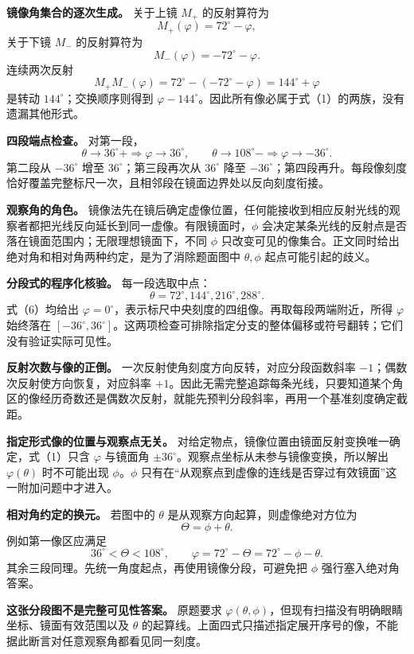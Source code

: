\documentclass[12pt,a4paper,UTF8]{ctexart}
\begin{document}
\textbf{镜像角集合的逐次生成。} 关于上镜 \(M_+\) 的反射算符为 \[
M_+(\varphi)=72^\circ-\varphi,
\] 关于下镜 \(M_-\) 的反射算符为 \[
M_-(\varphi)=-72^\circ-\varphi.
\] 连续两次反射 \[
M_+M_-(\varphi)
=72^\circ-(-72^\circ-\varphi)
=144^\circ+\varphi
\] 是转动 \(144^\circ\)；交换顺序则得到
\(\varphi-144^\circ\)。因此所有像必属于式（1）的两族，没有遗漏其他形式。

\textbf{四段端点检查。} 对第一段， \[
\theta\to36^\circ+\Rightarrow\varphi\to36^\circ,
\qquad
\theta\to108^\circ-\Rightarrow\varphi\to-36^\circ.
\] 第二段从 \(-36^\circ\) 增至 \(36^\circ\)；第三段再次从 \(36^\circ\)
降至
\(-36^\circ\)；第四段再升。每段像刻度恰好覆盖完整标尺一次，且相邻段在镜面边界处以反向刻度衔接。

\textbf{观察角的角色。}
镜像法先在镜后确定虚像位置，任何能接收到相应反射光线的观察者都把光线反向延长到同一虚像。有限镜面时，\(\phi\)
会决定某条光线的反射点是否落在镜面范围内；无限理想镜面下，不同 \(\phi\)
只改变可见的像集合。正文同时给出绝对角和相对角两种约定，是为了消除题面图中
\(\theta,\phi\) 起点可能引起的歧义。

\textbf{分段式的程序化核验。} 每一段选取中点： \[
\theta=72^\circ,144^\circ,216^\circ,288^\circ.
\] 式（6）均给出
\(\varphi=0^\circ\)，表示标尺中央刻度的四组像。再取每段两端附近，所得
\(\varphi\) 始终落在
\([-36^\circ,36^\circ]\)。这两项检查可排除指定分支的整体偏移或符号翻转；它们没有验证实际可见性。

\textbf{反射次数与像的正倒。} 一次反射使角刻度方向反转，对应分段函数斜率
\(-1\)；偶数次反射使方向恢复，对应斜率
\(+1\)。因此无需完整追踪每条光线，只要知道某个角区的像经历奇数还是偶数次反射，就能先预判分段斜率，再用一个基准刻度确定截距。

\textbf{指定形式像的位置与观察点无关。}
对给定物点，镜像位置由镜面反射变换唯一确定，式（1）只含 \(\varphi\)
与镜面角 \(\pm36^\circ\)。观察点坐标从未参与镜像变换，所以解出
\(\varphi(\theta)\) 时不可能出现 \(\phi\)。\(\phi\)
只有在``从观察点到虚像的连线是否穿过有效镜面''这一附加问题中才进入。

\textbf{相对角约定的换元。} 若图中的 \(\theta\)
是从观察方向起算，则虚像绝对方位为 \[
\Theta=\phi+\theta.
\] 例如第一像区应满足 \[
36^\circ<\Theta<108^\circ,\qquad
\varphi=72^\circ-\Theta
=72^\circ-\phi-\theta.
\] 其余三段同理。先统一角度起点，再使用镜像分段，可避免把 \(\phi\)
强行塞入绝对角答案。

\textbf{这张分段图不是完整可见性答案。} 原题要求
\(\varphi(\theta,\phi)\)，但现有扫描没有明确眼睛坐标、镜面有效范围以及
\(\theta\)
的起算线。上面四式只描述指定展开序号的像，不能据此断言对任意观察角都看见同一刻度。
\end{document}
